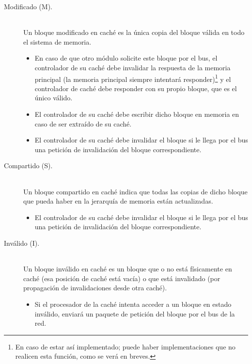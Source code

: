 \begin{description}
    \item [Modificado (M).]~\\
        Un bloque modificado en caché es la única copia del bloque válida en todo el sistema de memoria. 
        \begin{itemize}
            \item En caso de que otro módulo solicite este bloque por el bus, el controlador de su caché debe invalidar la respuesta de la memoria principal (la memoria principal siempre intentará responder)\footnote{En caso de estar así implementado; puede haber implementaciones que no realicen esta función, como se verá en breves.} y el controlador de caché debe responder con su propio bloque, que es el único válido.
            \item El controlador de su caché debe escribir dicho bloque en memoria en caso de ser extraído de su caché.
            \item El controlador de su caché debe invalidar el bloque si le llega por el bus una petición de invalidación del bloque correspondiente.
        \end{itemize}

    \item [Compartido (S).]~\\
        Un bloque compartido en caché indica que todas las copias de dicho bloque que pueda haber en la jerarquía de memoria están actualizadas.

        \begin{itemize}
            \item El controlador de su caché debe invalidar el bloque si le llega por el bus una petición de invalidación del bloque correspondiente.
        \end{itemize}

    \item [Inválido (I).]~\\
        Un bloque inválido en caché es un bloque que o no está físicamente en caché (esa posición de caché está vacía) o que está invalidado (por propagación de invalidaciones desde otra caché).

        \begin{itemize}
            \item Si el procesador de la caché intenta acceder a un bloque en estado inválido, enviará un paquete de petición del bloque por el bus de la red.
        \end{itemize}
\end{description}
